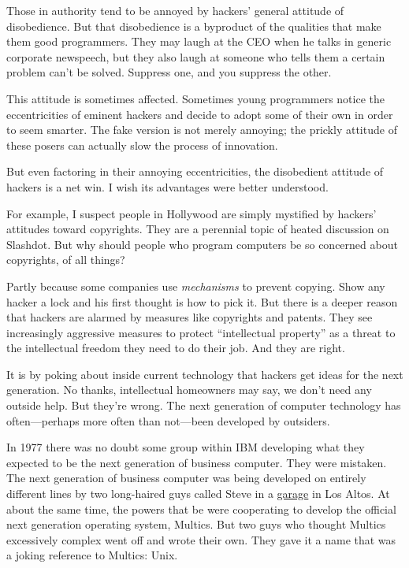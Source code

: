 Those in authority tend to be annoyed by hackers' general attitude of
disobedience. But that disobedience is a byproduct of the qualities that
make them good programmers. They may laugh at the CEO when he talks in
generic corporate newspeech, but they also laugh at someone who tells
them a certain problem can't be solved. Suppress one, and you suppress
the other.

This attitude is sometimes affected. Sometimes young programmers notice
the eccentricities of eminent hackers and decide to adopt some of their
own in order to seem smarter. The fake version is not merely annoying;
the prickly attitude of these posers can actually slow the process of
innovation.

But even factoring in their annoying eccentricities, the disobedient
attitude of hackers is a net win. I wish its advantages were better
understood.

For example, I suspect people in Hollywood are simply mystified by
hackers' attitudes toward copyrights. They are a perennial topic of
heated discussion on Slashdot. But why should people who program
computers be so concerned about copyrights, of all things?

Partly because some companies use \emph{mechanisms} to prevent copying.
Show any hacker a lock and his first thought is how to pick it. But
there is a deeper reason that hackers are alarmed by measures like
copyrights and patents. They see increasingly aggressive measures to
protect ``intellectual property'' as a threat to the intellectual
freedom they need to do their job. And they are right.

It is by poking about inside current technology that hackers get ideas
for the next generation. No thanks, intellectual homeowners may say, we
don't need any outside help. But they're wrong. The next generation of
computer technology has often---perhaps more often than not---been
developed by outsiders.

In 1977 there was no doubt some group within IBM developing what they
expected to be the next generation of business computer. They were
mistaken. The next generation of business computer was being developed
on entirely different lines by two long-haired guys called Steve in a
\href{garage.html}{garage} in Los Altos. At about the same time, the
powers that be were cooperating to develop the official next generation
operating system, Multics. But two guys who thought Multics excessively
complex went off and wrote their own. They gave it a name that was a
joking reference to Multics: Unix.


